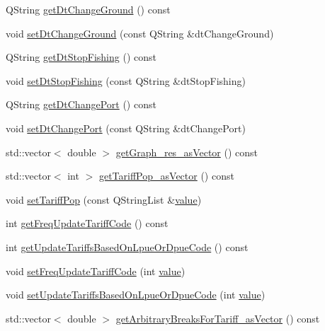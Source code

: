 \begin{DoxyCompactItemize}
\item 
Q\+String \mbox{\hyperlink{class_scenario_aa4328db4384a85b495decde1f76e9e3c}{get\+Dt\+Change\+Ground}} () const
\item 
void \mbox{\hyperlink{class_scenario_a5c3714ea69e729f4269b5c2b3fb120e5}{set\+Dt\+Change\+Ground}} (const Q\+String \&dt\+Change\+Ground)
\item 
Q\+String \mbox{\hyperlink{class_scenario_abe62f8d2c3979868ce88a71b9bea9338}{get\+Dt\+Stop\+Fishing}} () const
\item 
void \mbox{\hyperlink{class_scenario_aa57c07db0cb9bb8a9786c65b004b710e}{set\+Dt\+Stop\+Fishing}} (const Q\+String \&dt\+Stop\+Fishing)
\item 
Q\+String \mbox{\hyperlink{class_scenario_a6986784a0e8ab9bde7614d5207bea794}{get\+Dt\+Change\+Port}} () const
\item 
void \mbox{\hyperlink{class_scenario_a6209ebc754dd40d01aefa0bc95b9e67d}{set\+Dt\+Change\+Port}} (const Q\+String \&dt\+Change\+Port)
\item 
std\+::vector$<$ double $>$ \mbox{\hyperlink{class_scenario_a991e4ff5d11e6e527a5262e4d7feb174}{get\+Graph\+\_\+res\+\_\+as\+Vector}} () const
\item 
std\+::vector$<$ int $>$ \mbox{\hyperlink{class_scenario_a86cb4dc5e33b8a8300dea84a8039d8b4}{get\+Tariff\+Pop\+\_\+as\+Vector}} () const
\item 
void \mbox{\hyperlink{class_scenario_a10049509906d39cf8e7b8894c9eff7a9}{set\+Tariff\+Pop}} (const Q\+String\+List \&\mbox{\hyperlink{diffusion_8cpp_a4b41795815d9f3d03abfc739e666d5da}{value}})
\item 
int \mbox{\hyperlink{class_scenario_a685a6f6452f7328b3bf8ac9918f54b69}{get\+Freq\+Update\+Tariff\+Code}} () const
\item 
int \mbox{\hyperlink{class_scenario_a0a8bdaa089513ce256896f9d5cf1ca78}{get\+Update\+Tariffs\+Based\+On\+Lpue\+Or\+Dpue\+Code}} () const
\item 
void \mbox{\hyperlink{class_scenario_aacab416a45c46bb906bf26e1f09bcf57}{set\+Freq\+Update\+Tariff\+Code}} (int \mbox{\hyperlink{diffusion_8cpp_a4b41795815d9f3d03abfc739e666d5da}{value}})
\item 
void \mbox{\hyperlink{class_scenario_ad87cb95d62609f48ff4a124e1c057fdb}{set\+Update\+Tariffs\+Based\+On\+Lpue\+Or\+Dpue\+Code}} (int \mbox{\hyperlink{diffusion_8cpp_a4b41795815d9f3d03abfc739e666d5da}{value}})
\item 
std\+::vector$<$ double $>$ \mbox{\hyperlink{class_scenario_ac733c0295cc65636cc76bab4b98f6664}{get\+Arbitrary\+Breaks\+For\+Tariff\+\_\+as\+Vector}} () const

\end{DoxyCompactItemize}
